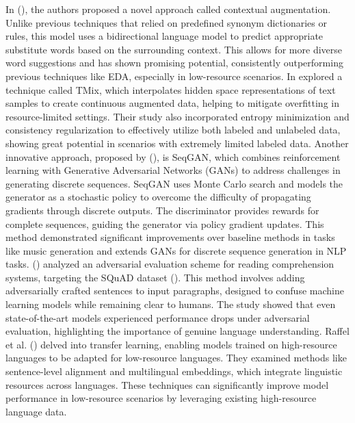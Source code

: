 In \citeauthor{kobayashi2018contextualaugmentationdataaugmentation} (\citeyear{kobayashi2018contextualaugmentationdataaugmentation}), the authors proposed a novel approach called contextual augmentation. Unlike previous techniques that relied on predefined synonym dictionaries or rules, this model uses a bidirectional language model to predict appropriate substitute words based on the surrounding context. This allows for more diverse word suggestions and has shown promising potential, consistently outperforming previous techniques like EDA, especially in low-resource scenarios. In
\citep{chen2020mixtextlinguisticallyinformedinterpolationhidden} explored a technique called TMix, which interpolates hidden space representations of text samples to create continuous augmented data, helping to mitigate overfitting in resource-limited settings. Their study also incorporated entropy minimization and consistency regularization to effectively utilize both labeled and unlabeled data, showing great potential in scenarios with extremely limited labeled data.
Another innovative approach, proposed by \citeauthor{yu2017seqgansequencegenerativeadversarial} (\citeyear{yu2017seqgansequencegenerativeadversarial}), is SeqGAN, which combines reinforcement learning with Generative Adversarial Networks (GANs) to address challenges in generating discrete sequences. SeqGAN uses Monte Carlo search and models the generator as a stochastic policy to overcome the difficulty of propagating gradients through discrete outputs. The discriminator provides rewards for complete sequences, guiding the generator via policy gradient updates. This method demonstrated significant improvements over baseline methods in tasks like music generation and extends GANs for discrete sequence generation in NLP tasks. \citeauthor{jia2017adversarialexamplesevaluatingreading} (\citeyear{jia2017adversarialexamplesevaluatingreading}) analyzed an adversarial evaluation scheme for reading comprehension systems, targeting the SQuAD dataset \citeauthor{rajpurkar-etal-2016-squad} (\citeyear{rajpurkar-etal-2016-squad}). This method involves adding adversarially crafted sentences to input paragraphs, designed to confuse machine learning models while remaining clear to humans. The study showed that even state-of-the-art models experienced performance drops under adversarial evaluation, highlighting the importance of genuine language understanding.
Raffel et al. (\citeyear{raffel2023exploringlimitstransferlearning}) delved into transfer learning, enabling models trained on high-resource languages to be adapted for low-resource languages. They examined methods like sentence-level alignment and multilingual embeddings, which integrate linguistic resources across languages. These techniques can significantly improve model performance in low-resource scenarios by leveraging existing high-resource language data.
